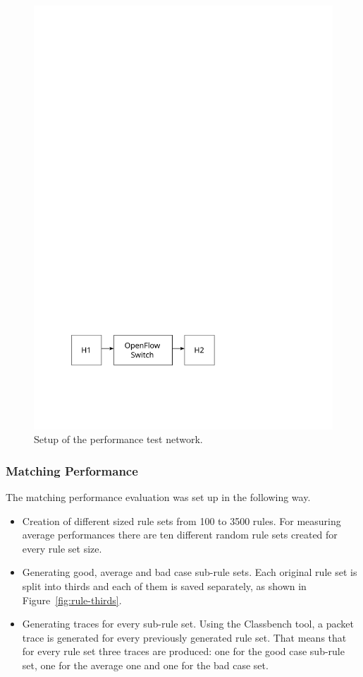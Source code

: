 \documentclass[a4paper,
		12pt,
		parskip=full,
		titlepage
		]{scrartcl}
\begin{document}
\begin{figure}
\centering
\includegraphics[height=0.1\textheight]{images/ofswitch-perftest}
\caption{Setup of the performance test network.}
\label{fig:ofswitch-perftest}
\end{figure}

\subsubsection{Matching Performance}
The matching performance evaluation was set up in the following way.
\begin{itemize}
    \item Creation of different sized rule sets from 100 to 3500 rules.
        For measuring average performances there are ten different random rule sets created for every rule set size.
    \item Generating good, average and bad case sub-rule sets. 
        Each original rule set is split into thirds and each of them is saved separately, 
        as shown in Figure~\ref{fig:rule-thirds}.
    \item Generating traces for every sub-rule set.
        Using the Classbench\cite{classbench_website} tool, a packet trace is generated for every previously generated rule set.
        That means that for every rule set three traces are produced: 
        one for the good case sub-rule set, one for the average one and one for the bad case set.
\end{itemize}
\end{document}
